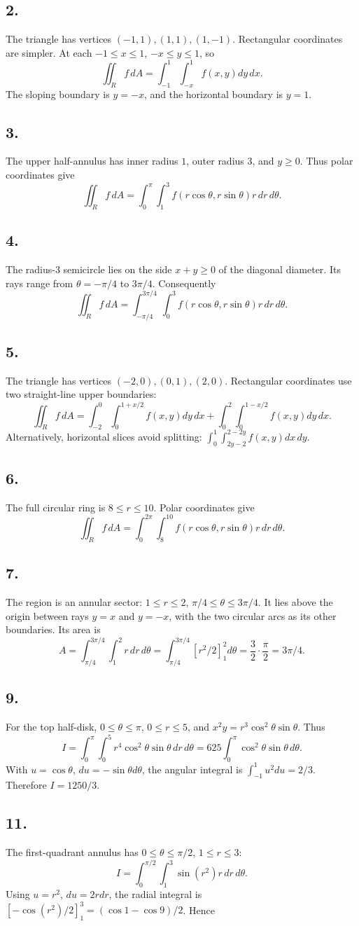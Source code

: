 \documentclass[11pt]{article}
\newcommand{\ex}[1]{\subsection*{#1.}}
\newcommand{\ans}[1]{\boxed{#1}}
\begin{document}
\ex{2}
The triangle has vertices $(-1,1),(1,1),(1,-1)$. Rectangular coordinates are simpler. At each $-1\le x\le1$, $-x\le y\le1$, so
\[\ans{\iint_R f\,dA=\int_{-1}^1\int_{-x}^1f(x,y)dy\,dx}.\]
The sloping boundary is $y=-x$, and the horizontal boundary is $y=1$.
\ex{3}
The upper half-annulus has inner radius $1$, outer radius $3$, and $y\ge0$. Thus polar coordinates give
\[\ans{\iint_R f\,dA=\int_0^\pi\int_1^3f(r\cos\theta,r\sin\theta)r\,dr\,d\theta}.\]
\ex{4}
The radius-$3$ semicircle lies on the side $x+y\ge0$ of the diagonal diameter. Its rays range from $\theta=-\pi/4$ to $3\pi/4$. Consequently
\[\ans{\iint_R f\,dA=\int_{-\pi/4}^{3\pi/4}\int_0^3f(r\cos\theta,r\sin\theta)r\,dr\,d\theta}.\]
\ex{5}
The triangle has vertices $(-2,0),(0,1),(2,0)$. Rectangular coordinates use two straight-line upper boundaries:
\[\ans{\iint_R f\,dA=\int_{-2}^0\int_0^{1+x/2}f(x,y)dy\,dx
+\int_0^2\int_0^{1-x/2}f(x,y)dy\,dx}.\]
Alternatively, horizontal slices avoid splitting: $\int_0^1\int_{2y-2}^{2-2y}f(x,y)dx\,dy$.
\ex{6}
The full circular ring is $8\le r\le10$. Polar coordinates give
\[\ans{\iint_R f\,dA=\int_0^{2\pi}\int_8^{10}f(r\cos\theta,r\sin\theta)r\,dr\,d\theta}.\]
\ex{7}
The region is an annular sector: $1\le r\le2$, $\pi/4\le\theta\le3\pi/4$. It lies above the origin between rays $y=x$ and $y=-x$, with the two circular arcs as its other boundaries. Its area is
\[A=\int_{\pi/4}^{3\pi/4}\int_1^2r\,dr\,d\theta
=\int_{\pi/4}^{3\pi/4}[r^2/2]_1^2d\theta=\frac32\cdot\frac\pi2=\ans{3\pi/4}.\]
\begin{center}\end{center}
\ex{9}
For the top half-disk, $0\le\theta\le\pi$, $0\le r\le5$, and $x^2y=r^3\cos^2\theta\sin\theta$. Thus
\[I=\int_0^\pi\int_0^5r^4\cos^2\theta\sin\theta\,dr\,d\theta
=625\int_0^\pi\cos^2\theta\sin\theta\,d\theta.\]
With $u=\cos\theta$, $du=-\sin\theta d\theta$, the angular integral is $\int_{-1}^1u^2du=2/3$. Therefore $\ans{I=1250/3}$.
\ex{11}
The first-quadrant annulus has $0\le\theta\le\pi/2$, $1\le r\le3$:
\[I=\int_0^{\pi/2}\int_1^3\sin(r^2)r\,dr\,d\theta.
\]
Using $u=r^2$, $du=2rdr$, the radial integral is $[-\cos(r^2)/2]_1^3=(\cos1-\cos9)/2$. Hence
\end{document}
